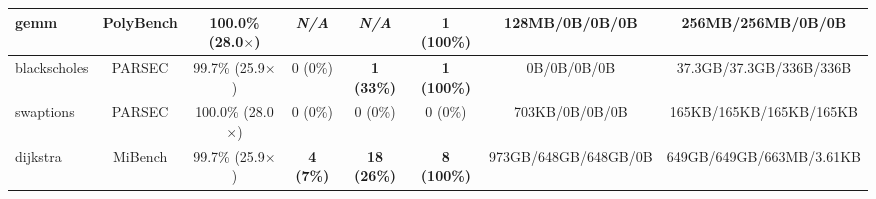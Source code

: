 {\begin{tabular}{|l|c|c||c|c||c|c|c|}
\hline
gemm     & PolyBench  & 100.0\% (28.0$\times$) & \textit{N/A} & \textit{N/A} & \textbf{1 (100\%)} &
         128MB/0B/0B/0B & 256MB/256MB/0B/0B \\ %
\hline
blackscholes & PARSEC & 99.7\% (25.9$\times$) & 0 (0\%) & \textbf{1 (33\%)} & \textbf{1 (100\%)} &
             0B/0B/0B/0B & 37.3GB/37.3GB/336B/336B \\ %
\hline
swaptions & PARSEC & 100.0\% (28.0$\times$)  & 0 (0\%) & 0 (0\%) & 0 (0\%) &
          703KB/0B/0B/0B & 165KB/165KB/165KB/165KB \\ %
\hline
dijkstra & MiBench  & 99.7\% (25.9$\times$) & \textbf{4 (7\%)} & \textbf{18 (26\%)} & \textbf{8 (100\%)} &
         973GB/648GB/648GB/0B & 649GB/649GB/663MB/3.61KB \\ %
\hline
\end{tabular}
}
